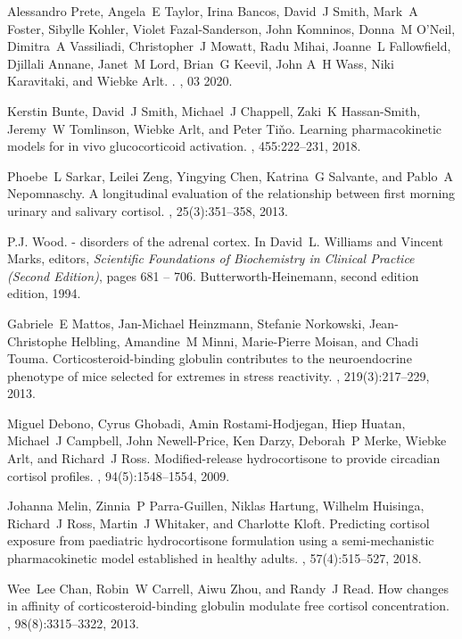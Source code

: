 \documentclass[12pt,a4paper]{article}
\begin{document}
\begin{thebibliography}{1}

Alessandro Prete, Angela~E Taylor, Irina Bancos, David~J Smith, Mark~A Foster,
  Sibylle Kohler, Violet Fazal-Sanderson, John Komninos, Donna~M O’Neil,
  Dimitra~A Vassiliadi, Christopher~J Mowatt, Radu Mihai, Joanne~L Fallowfield,
  Djillali Annane, Janet~M Lord, Brian~G Keevil, John A~H Wass, Niki
  Karavitaki, and Wiebke Arlt.
.
, 03 2020.

Kerstin Bunte, David~J Smith, Michael~J Chappell, Zaki~K Hassan-Smith, Jeremy~W
  Tomlinson, Wiebke Arlt, and Peter Ti{\v{n}}o.
\newblock Learning pharmacokinetic models for in vivo glucocorticoid
  activation.
, 455:222--231, 2018.

Phoebe~L Sarkar, Leilei Zeng, Yingying Chen, Katrina~G Salvante, and Pablo~A
  Nepomnaschy.
\newblock A longitudinal evaluation of the relationship between first morning
  urinary and salivary cortisol.
, 25(3):351--358, 2013.

P.J. Wood.
 - disorders of the adrenal cortex.
\newblock In David~L. Williams and Vincent Marks, editors, {\em Scientific
  Foundations of Biochemistry in Clinical Practice (Second Edition)}, pages 681
  -- 706. Butterworth-Heinemann, second edition edition, 1994.

Gabriele~E Mattos, Jan-Michael Heinzmann, Stefanie Norkowski, Jean-Christophe
  Helbling, Amandine~M Minni, Marie-Pierre Moisan, and Chadi Touma.
\newblock Corticosteroid-binding globulin contributes to the neuroendocrine
  phenotype of mice selected for extremes in stress reactivity.
, 219(3):217--229, 2013.

Miguel Debono, Cyrus Ghobadi, Amin Rostami-Hodjegan, Hiep Huatan, Michael~J
  Campbell, John Newell-Price, Ken Darzy, Deborah~P Merke, Wiebke Arlt, and
  Richard~J Ross.
\newblock Modified-release hydrocortisone to provide circadian cortisol
  profiles.
, 94(5):1548--1554, 2009.

Johanna Melin, Zinnia~P Parra-Guillen, Niklas Hartung, Wilhelm Huisinga,
  Richard~J Ross, Martin~J Whitaker, and Charlotte Kloft.
\newblock Predicting cortisol exposure from paediatric hydrocortisone
  formulation using a semi-mechanistic pharmacokinetic model established in
  healthy adults.
, 57(4):515--527, 2018.

Wee~Lee Chan, Robin~W Carrell, Aiwu Zhou, and Randy~J Read.
\newblock How changes in affinity of corticosteroid-binding globulin modulate
  free cortisol concentration.
, 98(8):3315--3322, 2013.

\end{thebibliography}
\end{document}
